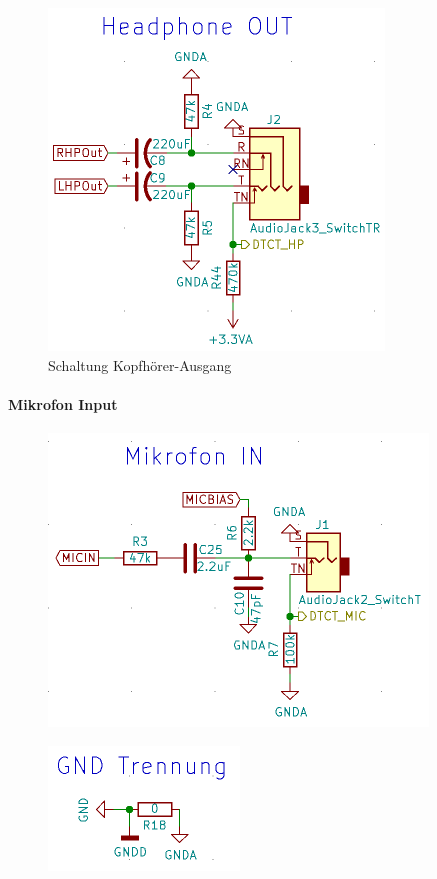 \begin{figure} [H]
\begin{center}
 \includegraphics[scale=0.5]{../graphics/Schema_HPOUT.png}
 \caption{Schaltung Kopfhörer-Ausgang}
\label{fig:Schema_HPOUT}
\end{center}
\end{figure}


\paragraph{Mikrofon Input}
\label{par:MicIN}

\begin{figure} [H]
\begin{center}
\includegraphics[scale=0.5]{../graphics/Schema_MicIN.png}
\caption{}
\label{fig:Schema_MicIN}
\end{center}
\end{figure}

\begin{figure} [H]
\begin{center}
 \includegraphics[scale=0.5]{../graphics/Schema_GND.png} 
\caption{}
\label{fig:Schema_GND}
\end{center}
\end{figure}



 